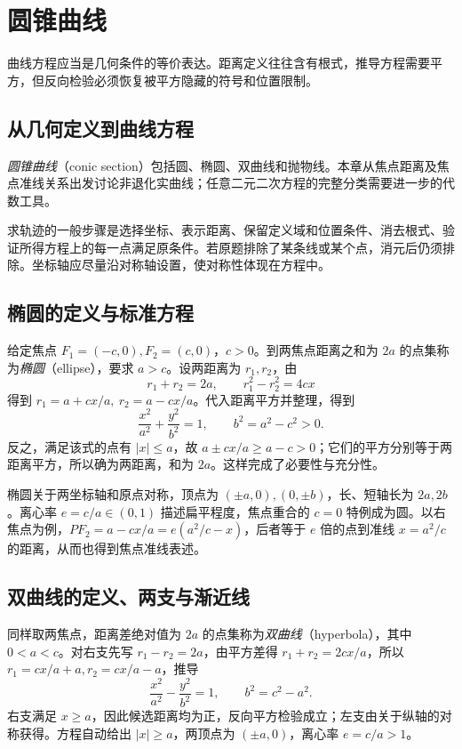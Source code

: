 \setcounter{chapter}{19} %
\chapter{圆锥曲线}
\label{chap:em-conics}
曲线方程应当是几何条件的等价表达。距离定义往往含有根式，推导方程需要平方，但反向检验必须恢复被平方隐藏的符号和位置限制。

\section{从几何定义到曲线方程}
\emph{圆锥曲线}（conic section）包括圆、椭圆、双曲线和抛物线。本章从焦点距离及焦点准线关系出发讨论非退化实曲线；任意二元二次方程的完整分类需要进一步的代数工具。

求轨迹的一般步骤是选择坐标、表示距离、保留定义域和位置条件、消去根式、验证所得方程上的每一点满足原条件。若原题排除了某条线或某个点，消元后仍须排除。坐标轴应尽量沿对称轴设置，使对称性体现在方程中。

\section{椭圆的定义与标准方程}
给定焦点 $F_1=(-c,0),F_2=(c,0)$，$c>0$。到两焦点距离之和为 $2a$ 的点集称为\emph{椭圆}（ellipse），要求 $a>c$。设两距离为 $r_1,r_2$，由
\[
 r_1+r_2=2a,\qquad r_1^2-r_2^2=4cx
\]
得到 $r_1=a+cx/a,\ r_2=a-cx/a$。代入距离平方并整理，得到
\begin{equation}\label{eq:em-ellipse}
 \frac{x^2}{a^2}+\frac{y^2}{b^2}=1,\qquad b^2=a^2-c^2>0.
\end{equation}
反之，满足该式的点有 $|x|\le a$，故 $a\pm cx/a\ge a-c>0$；它们的平方分别等于两距离平方，所以确为两距离，和为 $2a$。这样完成了必要性与充分性。

椭圆关于两坐标轴和原点对称，顶点为 $(\pm a,0),(0,\pm b)$，长、短轴长为 $2a,2b$。离心率 $e=c/a\in(0,1)$ 描述扁平程度，焦点重合的 $c=0$ 特例成为圆。以右焦点为例，$PF_2=a-cx/a=e(a^2/c-x)$，后者等于 $e$ 倍的点到准线 $x=a^2/c$ 的距离，从而也得到焦点准线表述。

\section{双曲线的定义、两支与渐近线}
同样取两焦点，距离差绝对值为 $2a$ 的点集称为\emph{双曲线}（hyperbola），其中 $0<a<c$。对右支先写 $r_1-r_2=2a$，由平方差得 $r_1+r_2=2cx/a$，所以 $r_1=cx/a+a,r_2=cx/a-a$，推导
\begin{equation}\label{eq:em-hyperbola}
 \frac{x^2}{a^2}-\frac{y^2}{b^2}=1,\qquad b^2=c^2-a^2.
\end{equation}
右支满足 $x\ge a$，因此候选距离均为正，反向平方检验成立；左支由关于纵轴的对称获得。方程自动给出 $|x|\ge a$，两顶点为 $(\pm a,0)$，离心率 $e=c/a>1$。

